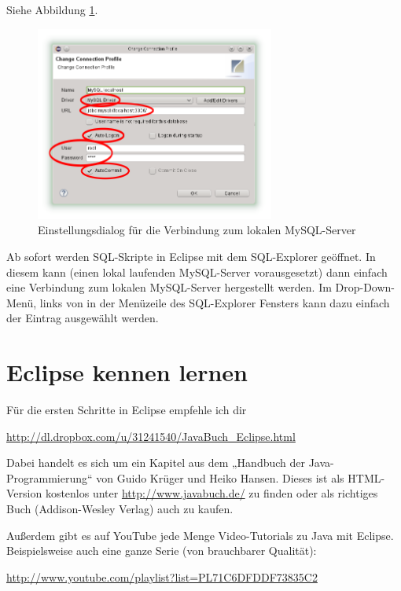 Siehe Abbildung \ref{fig:sql-explorer-connection-profile}.

\begin{figure}[h]
  \centering
   \includegraphics[width=0.7\textwidth]{./inf/SEKII/01_Vorbereitung/SQL-Explorer_Connection-Profile.png}
   \caption{Einstellungsdialog für die Verbindung zum lokalen MySQL-Server}
   \label{fig:sql-explorer-connection-profile}
\end{figure}

Ab sofort werden SQL-Skripte in Eclipse mit dem SQL-Explorer geöffnet. In diesem
kann (einen lokal laufenden MySQL-Server vorausgesetzt)  dann einfach eine
Verbindung zum lokalen MySQL-Server hergestellt werden. Im Drop-Down-Menü,
links von  in der Menüzeile des SQL-Explorer Fensters kann
dazu einfach der Eintrag  ausgewählt werden.



\section{Eclipse kennen lernen}

Für die ersten Schritte in Eclipse empfehle ich dir

\url{http://dl.dropbox.com/u/31241540/JavaBuch_Eclipse.html} 

Dabei handelt es sich um ein Kapitel aus dem „Handbuch der Java-Programmierung“
von Guido Krüger und Heiko Hansen. Dieses ist als HTML-Version kostenlos unter
\url{http://www.javabuch.de/} zu finden oder als richtiges Buch (Addison-Wesley
Verlag) auch zu kaufen.

\begin{minipage}{\textwidth}
Außerdem gibt es auf YouTube jede Menge Video-Tutorials zu Java mit Eclipse.
Beispielsweise auch eine ganze Serie (von brauchbarer Qualität):

\url{http://www.youtube.com/playlist?list=PL71C6DFDDF73835C2}
\end{minipage}
